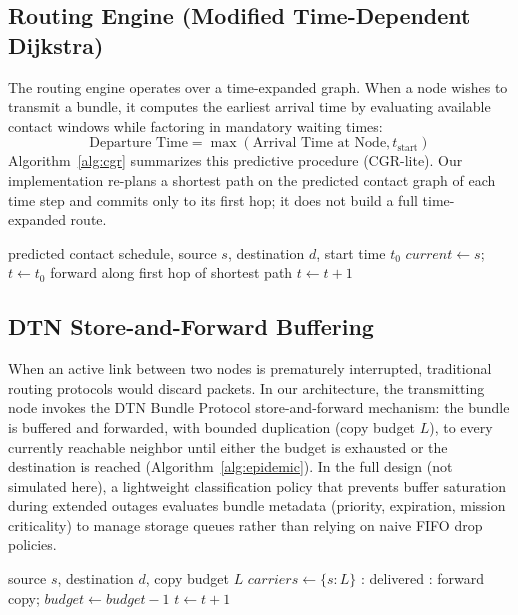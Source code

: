 \documentclass[10pt,twocolumn]{article}
\begin{document}
\subsection{Routing Engine (Modified Time-Dependent Dijkstra)}
The routing engine operates over a time-expanded graph. When a node wishes to transmit a bundle, it computes the earliest arrival time by evaluating available contact windows while factoring in mandatory waiting times:
\begin{equation}
\text{Departure Time} = \max(\text{Arrival Time at Node}, t_{\text{start}})
\end{equation}
Algorithm~\ref{alg:cgr} summarizes this predictive procedure (CGR-lite). Our implementation re-plans a shortest path on the predicted contact graph of each time step and commits only to its first hop; it does not build a full time-expanded route.

\begin{algorithm}[t]
\caption{CGR-lite Earliest-Arrival Routing}
\label{alg:cgr}
\begin{algorithmic}[1]
\Require predicted contact schedule, source $s$, destination $d$, start time $t_0$
\State $current \gets s$; $t \gets t_0$
        \State forward along first hop of shortest path
    \Else
        \State $t \gets t+1$ 
    \EndIf
\EndWhile
\end{algorithmic}
\end{algorithm}

\subsection{DTN Store-and-Forward Buffering}
When an active link between two nodes is prematurely interrupted, traditional routing protocols would discard packets. In our architecture, the transmitting node invokes the DTN Bundle Protocol store-and-forward mechanism: the bundle is buffered and forwarded, with bounded duplication (copy budget $L$), to every currently reachable neighbor until either the budget is exhausted or the destination is reached (Algorithm~\ref{alg:epidemic}). In the full design (not simulated here), a lightweight classification policy that prevents buffer saturation during extended outages evaluates bundle metadata (priority, expiration, mission criticality) to manage storage queues rather than relying on naive FIFO drop policies.

\begin{algorithm}[t]
\caption{Bounded Epidemic Store-and-Forward}
\label{alg:epidemic}
\begin{algorithmic}[1]
\Require source $s$, destination $d$, copy budget $L$
\State $carriers \gets \{s : L\}$
        : delivered
        : forward copy; $budget \gets budget-1$
        \EndIf
    \EndFor
    \State $t \gets t+1$
\EndWhile
\end{algorithmic}
\end{algorithm}
\end{document}
